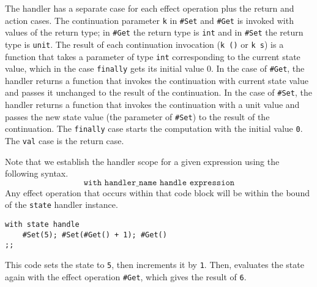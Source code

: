 The handler has a separate case for each effect operation plus the return and action cases. The continuation parameter \texttt{k} in \texttt{\#Set} and \texttt{\#Get} is invoked with values of the return type; in \texttt{\#Get} the return type is \texttt{int} and in \texttt{\#Set} the return type is \texttt{unit}. The result of each continuation invocation (\texttt{k ()} or \texttt{k s}) is a function that takes a parameter of type \texttt{int} corresponding to the current state value, which in the case \texttt{finally} gets its initial value 0. In the case of \texttt{\#Get}, the handler returns a function that invokes the continuation with current state value and passes it unchanged to the result of the continuation. In the case of \texttt{\#Set}, the handler returns a function that invokes the continuation with a unit value and passes the new state value (the parameter of \texttt{\#Set}) to the result of the continuation. The \texttt{finally} case starts the computation with the initial value \texttt{0}. The \texttt{val} case is the return case. 
%

Note that we establish the handler scope for a given expression using the following syntax.
%
\[
\texttt{with handler\_name handle expression}
\]
%
Any effect operation that occurs within that code block will be within the bound of the \texttt{state} handler instance. 
\begin{lstlisting}
with state handle
    #Set(5); #Set(#Get() + 1); #Get()
;;
\end{lstlisting}
%
This code sets the state to \texttt{5}, then increments it by \texttt{1}. Then, evaluates the state again with the effect operation \texttt{\#Get}, which gives the result of \texttt{6}. 